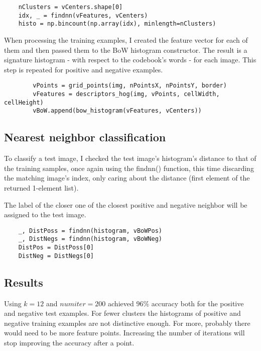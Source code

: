 \documentclass[10pt,a4paper,twoside]{article}
\begin{document}
\begin{verbatim}
    nClusters = vCenters.shape[0]
    idx, _ = findnn(vFeatures, vCenters)
    histo = np.bincount(np.array(idx), minlength=nClusters)
\end{verbatim}

When processing the training examples, I created the feature vector for each of
them and then passed them to the BoW histogram constructor. The result is a
signature histogram - with respect to the codebook's words - for each image.
This step is repeated for positive and negative examples.

\begin{verbatim}
        vPoints = grid_points(img, nPointsX, nPointsY, border)
        vFeatures = descriptors_hog(img, vPoints, cellWidth, cellHeight)
        vBoW.append(bow_histogram(vFeatures, vCenters))
\end{verbatim}

\subsection{Nearest neighbor classification}
To classify a test image, I checked the test image's histogram's distance to
that of the training samples, once again using the findnn() function, this time
discarding the matching image's index, only caring about the distance (first
element of the returned 1-element list).

The label of the closer one of the closest positive and negative neighbor will be
assigned to the test image.

\begin{verbatim}
    _, DistPoss = findnn(histogram, vBoWPos)
    _, DistNegs = findnn(histogram, vBoWNeg)
    DistPos = DistPoss[0]
    DistNeg = DistNegs[0]
\end{verbatim}

\subsection{Results}
Using $k=12$ and $numiter=200$ achieved $96\%$ accuracy both for the positive
and negative test examples. For fewer clusters the histograms of positive and
negative training examples are not distinctive enough. For more, probably there
would need to be more feature points. Increasing the number of iterations will
stop improving the accuracy after a point.
\end{document}
